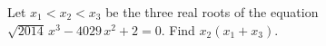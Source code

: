 Let $x_{1}<x_{2}<x_{3}$ be the three real roots of the equation $\sqrt{2014}\,x^{3}-4029\,x^{2}+2=0$. Find $x_{2}(x_{1}+x_{3})$.